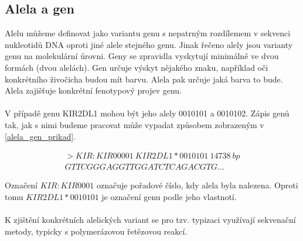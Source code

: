\documentclass[czech,DP]{thesiskiv}
\numberwithin{equation}{section}
\begin{document}
\subsection{Alela a gen}
Alelu můžeme definovat jako variantu genu s nepatrným rozdílemem v sekvenci nukleotidů DNA oproti jiné alele stejného genu. Jinak řečeno alely jsou varianty genu na molekulární úrovni. Geny se zpravidla vyskytují minimálně ve dvou formách (dvou alelách). Gen určuje výskyt nějakého znaku, například oči konkrétního živočicha budou mít barvu. Alela pak určuje jaká barva to bude. Alela zajišťuje konkrétní fenotypový projev genu.
\\
\\
V případě genu KIR2DL1 mohou být jeho alely 0010101 a 0010102. Zápis genů tak, jak s nimi budeme pracovat může vypadat způsobem zobrazeným v \ref{alela_gen_prikad}. 

\begin{equation}\begin{split} 
   \label{alela_gen_prikad}
   		>KIR:KIR00001\: KIR2DL1*0010101\: 14738\: bp \\
		GTTCGGGAGGTTGGATCTCAGACGTG...
\end{split}\end{equation}

\noindent 
Označení $KIR:KIR0001$ označuje pořadové číslo, kdy alela byla nalezena. Oproti tomu $KIR2DL1*0010101$ je označení genu podle jeho vlastnotí.
\\
\\
K zjištění konkrétních alelických variant se pro tzv. typizaci využívají sekvenační metody, typicky s polymerázovou řetězovou reakcí. 
\end{document}
